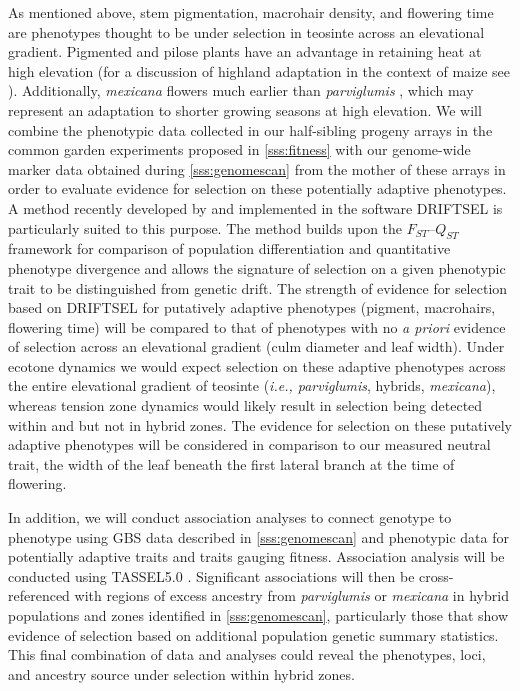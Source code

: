 As mentioned above, stem pigmentation, macrohair density, and flowering time are phenotypes thought to be under selection in teosinte across an elevational gradient.
Pigmented and pilose plants have an advantage in retaining heat at high elevation (for a discussion of highland adaptation in the context of maize see \citealt{Eagles1994}).
Additionally, \emph{mexicana} flowers much earlier than \emph{parviglumis} \citep{Rodriguez2006}, which may represent an adaptation to shorter growing seasons at high elevation.
We will combine the phenotypic data collected in our half-sibling progeny arrays in the common garden experiments proposed in \ref{sss:fitness} with our genome-wide marker data obtained during \ref{sss:genomescan} from the mother of these arrays in order to evaluate evidence for selection on these potentially adaptive phenotypes.
A method recently developed by \citet{Ovaskainen2011} and implemented in the software DRIFTSEL \citep{Karhunen2013} is particularly suited to this purpose.
The method builds upon the $F_{ST}$--$Q_{ST}$ framework \citep{leinonen2013} for comparison of population differentiation and quantitative phenotype divergence and allows the signature of selection on a given phenotypic trait to be distinguished from genetic drift.
The strength of evidence for selection based on DRIFTSEL for putatively adaptive phenotypes (pigment, macrohairs, flowering time) will be compared to that of phenotypes with no \emph{a priori} evidence of selection across an elevational gradient (culm diameter and leaf width).
Under ecotone dynamics we would expect selection on these adaptive phenotypes across the entire elevational gradient of teosinte (\emph{i.e., parviglumis}, hybrids, \emph{mexicana}), whereas tension zone dynamics would likely result in selection being detected within \zp{} and \zm{} but not in hybrid zones.
The evidence for selection on these putatively adaptive phenotypes will be considered in comparison to our measured neutral trait, the width of the leaf beneath the first lateral branch at the time of flowering.

In addition, we will conduct association analyses to connect genotype to phenotype using GBS data described in \ref{sss:genomescan} and phenotypic data for potentially adaptive traits and traits gauging fitness.
Association analysis will be conducted using TASSEL5.0 \citep{Bradbury2007}. Significant associations will then be cross-referenced with regions of excess ancestry from \emph{parviglumis} or \emph{mexicana} in hybrid populations and zones identified in \ref{sss:genomescan}, particularly those that show evidence of selection based on additional population genetic summary statistics.
This final combination of data and analyses could reveal the phenotypes, loci, and ancestry source under selection within hybrid zones.

